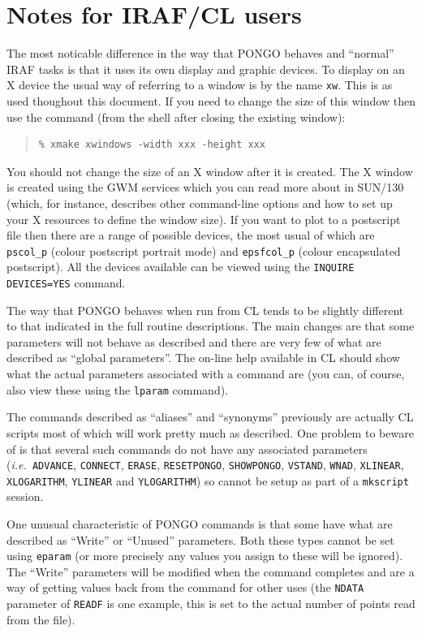 \documentclass[twoside,11pt]{article}
\newcommand{\htmlref}[2]{#1}
\newcommand{\xref}[3]{#1}
\renewcommand{\_}{\texttt{\symbol{95}}}
\newcommand{\ie}{{\em i.e.\ }}
\newcommand{\pnam}[1]{{\tt #1}}
\newcommand{\cnam}[1]{{\tt #1}}
\newcommand{\iref} [1]{\htmlref{#1}{#1}}
\begin{document}
\section{Notes for IRAF/CL users}

The most noticable difference in the way that PONGO behaves and
``normal'' IRAF tasks is that it uses its own display and graphic
devices. To display on an X device the usual way of referring to a
window is by the name \verb+xw+. This is as used thoughout this
document. If you need to change the size of this window then use the
command (from the shell after closing the existing window):
\begin{quote}
\begin{verbatim}
% xmake xwindows -width xxx -height xxx
\end{verbatim}
\end{quote}
You should not change the size of an X window after it is created.
The X window is created using the GWM services which you can read
more about in \xref{SUN/130}{sun130}{} (which, for instance, describes
other command-line options and how to set up your X resources to define the
window size). If you want to plot to a postscript file then there are
a range of possible devices, the most usual of which are
\verb+pscol_p+ (colour postscript portrait mode) and \verb+epsfcol_p+ (colour
encapsulated postscript). All the devices available can be viewed
using the \cnam{\iref{INQUIRE} DEVICES=YES} command.

The way that PONGO behaves when run from CL tends to be slightly
different to that indicated in the full routine descriptions. The main
changes are that some parameters will not behave as described and
there are very few of what are described as ``global parameters''. The
on-line help available in CL should show what the actual parameters
associated with a command are (you can, of course, also view these
using the \verb+lparam+ command).

The commands described as ``aliases'' and ``synonyms'' previously are
actually CL scripts most of which will work pretty much as
described. One problem to beware of is that several such commands do
not have any associated parameters (\ie \cnam{ADVANCE},
\cnam{CONNECT}, \cnam{ERASE}, \cnam{RESETPONGO}, \cnam{SHOWPONGO},
\cnam{VSTAND}, \cnam{WNAD}, \cnam{XLINEAR}, \cnam{XLOGARITHM},
\cnam{YLINEAR} and \cnam{YLOGARITHM}) so cannot be setup as part of a
\verb+mkscript+ session.

One unusual characteristic of PONGO commands is that some have what
are described as ``Write'' or ``Unused'' parameters. Both these types
cannot be set using \verb+eparam+ (or more precisely any values you
assign to these will be ignored). The ``Write'' parameters will be
modified when the command completes and are a way of getting values
back from the command for other uses (the \pnam{NDATA} parameter of
\cnam{READF} is one example, this is set to the actual number of
points read from the file).
\end{document}
